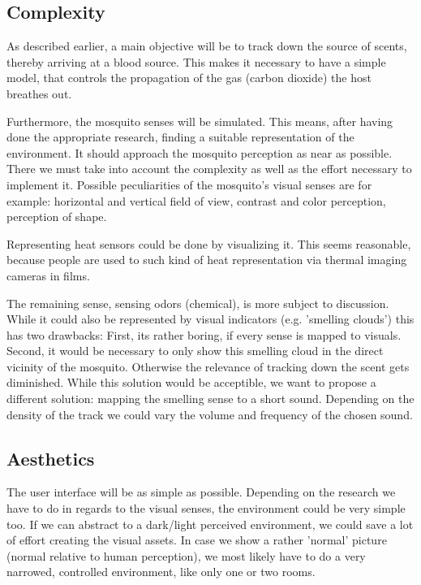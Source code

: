 \documentclass{acm_proc_article-sp}
\begin{document}
\subsection{Complexity}
As described earlier, a main objective will be to track down the source of scents, thereby arriving at a blood source. This makes it necessary to have a simple model, that controls the propagation of the gas (carbon dioxide) the host breathes out.

Furthermore, the mosquito senses will be simulated. This means, after having done the appropriate research, finding a suitable representation of the environment. It should approach the mosquito perception as near as possible. There we must take into account the complexity as well as the effort necessary to implement it. Possible peculiarities of the mosquito's visual senses are for example: horizontal and vertical field of view, contrast and color perception, perception of shape. 

Representing heat sensors could be done by visualizing it. This seems reasonable, because people are used to such kind of heat representation via thermal imaging cameras in films.

The remaining sense, sensing odors (chemical), is more subject to discussion. While it could also be represented by visual indicators (e.g. 'smelling clouds') this has two drawbacks: First, its rather boring, if every sense is mapped to visuals. Second, it would be necessary to only show this smelling cloud in the direct vicinity of the mosquito. Otherwise the relevance of tracking down the scent gets diminished. While this solution would be acceptible, we want to propose a different solution: mapping the smelling sense to a short sound. Depending on the density of the track we could vary the volume and frequency of the chosen sound. 

\subsection{Aesthetics}
The user interface will be as simple as possible. Depending on the research we have to do in regards to the visual senses, the environment could be very simple too. If we can abstract to a dark/light perceived environment, we could save a lot of effort creating the visual assets. In case we show a rather 'normal' picture (normal relative to human perception), we most likely have to do a very narrowed, controlled environment, like only one or two rooms.
\end{document}
